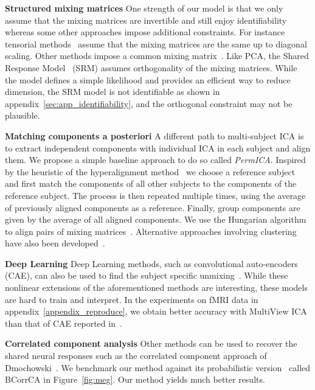 \textbf{Structured mixing matrices} One strength of our model is that we only assume that the mixing matrices are invertible and still enjoy identifiability whereas some other approaches impose additional constraints. For instance tensorial methods~\cite{beckmann2005tensorial} assume that the mixing matrices are the same up to diagonal scaling.
%
Other methods impose a common mixing matrix~\cite{cong2013validating, grin2010independent, calhoun2001fmri, Monti18UAI}. Like PCA, the Shared Response Model~\cite{chen2015reduced} (SRM) assumes orthogonality of the mixing matrices. While the model defines a simple likelihood and provides an efficient way to reduce dimension, the SRM model is not identifiable as shown in appendix~\ref{sec:app_identifiability}, and the orthogonal constraint may not be plausible.
%

\textbf{Matching components a posteriori} A different path to multi-subject ICA is to extract independent components with individual ICA in each subject and align them. We propose a simple baseline approach to do so called \emph{PermICA}.
Inspired by the heuristic of the hyperalignment method~\cite{haxby2011common} we choose a reference subject and first match the components of all other subjects to the components of the reference subject. The process is then repeated multiple times, using the average of previously aligned components as a reference. Finally, group components are given by the average of all aligned components. We use the Hungarian algorithm to align pairs of mixing matrices~\cite{tichavsky2004optimal}.
%
Alternative approaches involving clustering have also been developed~\cite{esposito2005independent,bigdely2013measure}.

\textbf{Deep Learning} Deep Learning methods, such as convolutional auto-encoders (CAE), can also be used to find the subject specific unmixing~\cite{chen2016convolutional}. While these nonlinear extensions of the aforementioned methods are interesting, these models are hard to train and interpret. In the experiments on fMRI data in appendix~\ref{appendix_reproduce}, we obtain better accuracy with MultiView ICA than that of CAE reported in~\cite{chen2016convolutional}.

\textbf{Correlated component analysis} Other methods can be used to recover the shared neural responses such as the correlated component approach of Dmochowski~\cite{dmochowski2012correlated}. We benchmark our method against its probabilistic version~\cite{kamronn2015multiview} called BCorrCA in Figure~\ref{fig:meg}. Our method yields much better results. 

